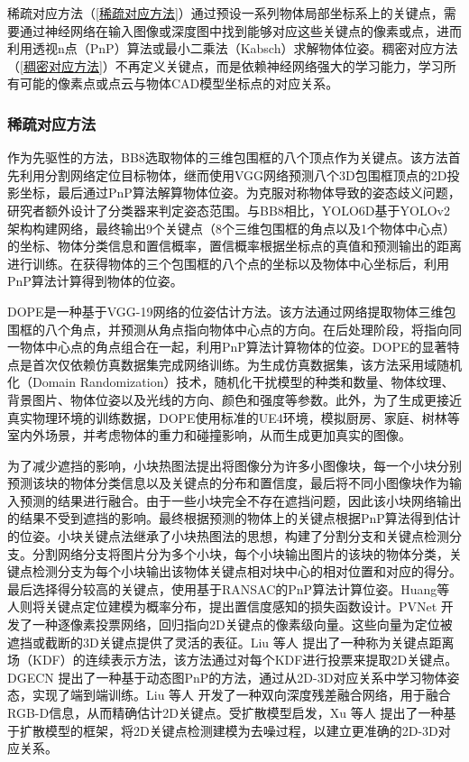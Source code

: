 \par 稀疏对应方法（\autoref{稀疏对应方法}）通过预设一系列物体局部坐标系上的关键点，需要通过神经网络在输入图像或深度图中找到能够对应这些关键点的像素或点，进而利用透视n点（PnP）算法\cite{EPnP}或最小二乘法（Kabsch）\cite{umeyama1991least}求解物体位姿。稠密对应方法（\autoref{稠密对应方法}）不再定义关键点，而是依赖神经网络强大的学习能力，学习所有可能的像素点或点云与物体CAD模型坐标点的对应关系。

\subsubsection{稀疏对应方法}\label{稀疏对应方法}
作为先驱性的方法，BB8\cite{rad2017bb8}选取物体的三维包围框的八个顶点作为关键点。该方法首先利用分割网络定位目标物体，继而使用VGG网络\cite{VGG}预测八个3D包围框顶点的2D投影坐标，最后通过PnP算法\cite{EPnP}解算物体位姿。为克服对称物体导致的姿态歧义问题，研究者额外设计了分类器来判定姿态范围。与BB8相比，YOLO6D\cite{tekin2018real}基于YOLOv2架构\cite{YOLO}构建网络，最终输出9个关键点（8个三维包围框的角点以及1个物体中心点）的坐标、物体分类信息和置信概率，置信概率根据坐标点的真值和预测输出的距离进行训练。在获得物体的三个包围框的八个点的坐标以及物体中心坐标后，利用PnP算法\cite{RANSAC}计算得到物体的位姿。

\par DOPE\cite{dope}是一种基于VGG-19\cite{VGG}网络的位姿估计方法。该方法通过网络提取物体三维包围框的八个角点，并预测从角点指向物体中心点的方向。在后处理阶段，将指向同一物体中心点的角点组合在一起，利用PnP算法计算物体的位姿。DOPE的显著特点是首次仅依赖仿真数据集完成网络训练。为生成仿真数据集，该方法采用域随机化（Domain Randomization）技术，随机化干扰模型的种类和数量、物体纹理、背景图片、物体位姿以及光线的方向、颜色和强度等参数。此外，为了生成更接近真实物理环境的训练数据，DOPE使用标准的UE4环境，模拟厨房、家庭、树林等室内外场景，并考虑物体的重力和碰撞影响，从而生成更加真实的图像。

为了减少遮挡的影响，小块热图法\cite{oberweger2018making}提出将图像分为许多小图像块，每一个小块分别预测该块的物体分类信息以及关键点的分布和置信度，最后将不同小图像块作为输入预测的结果进行融合。由于一些小块完全不存在遮挡问题，因此该小块网络输出的结果不受到遮挡的影响。最终根据预测的物体上的关键点根据PnP算法得到估计的位姿。小块关键点法\cite{2019segmentation}继承了小块热图法的思想，构建了分割分支和关键点检测分支。分割网络分支将图片分为多个小块，每个小块输出图片的该块的物体分类，关键点检测分支为每个小块输出该物体关键点相对块中心的相对位置和对应的得分。最后选择得分较高的关键点，使用基于RANSAC的PnP算法计算位姿。Huang等人\cite{Huang2021Confidence}则将关键点定位建模为概率分布，提出置信度感知的损失函数设计。PVNet\cite{pvnet} 开发了一种逐像素投票网络，回归指向2D关键点的像素级向量。这些向量为定位被遮挡或截断的3D关键点提供了灵活的表征。Liu 等人\cite{liu2021kdfnet} 提出了一种称为关键点距离场（KDF）的连续表示方法，该方法通过对每个KDF进行投票来提取2D关键点。DGECN\cite{cao2022dgecn} 提出了一种基于动态图PnP\cite{RANSAC}的方法，通过从2D-3D对应关系中学习物体姿态，实现了端到端训练。Liu 等人\cite{liu2023bdr6d} 开发了一种双向深度残差融合网络，用于融合RGB-D信息，从而精确估计2D关键点。受扩散模型启发，Xu 等人\cite{xu20246ddiff} 提出了一种基于扩散模型的框架，将2D关键点检测建模为去噪过程，以建立更准确的2D-3D对应关系。

